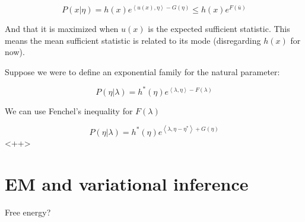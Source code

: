 \documentclass[a4paper]{article}
\begin{document}
\begin{equation}
  P( x \vert \eta) = h(x) e^{ \left< u(x), \eta \right> - G(\eta) } \leq h(x) e^{ F( \bar{u} ) }
  \label{}
\end{equation}

And that it is maximized when $u(x)$ is the expected sufficient statistic.  This means the mean sufficient statistic is related to its mode (disregarding $h(x)$ for now).  

Suppose we were to define an exponential family for the natural parameter:

\begin{equation}
  P( \eta \vert \lambda ) = h^*(\eta) e^{ \left< \lambda, \eta \right> - F(\lambda) }
  \label{}
\end{equation}

We can use Fenchel's inequality for $F(\lambda)$

\begin{equation}
  P( \eta \vert \lambda ) = h^*(\eta) e^{ \left< \lambda, \eta - \eta^* \right> + G(\eta) }
  \label{<++>}
\end{equation}<++>

\section{EM and variational inference}

Free energy?
\end{document}
